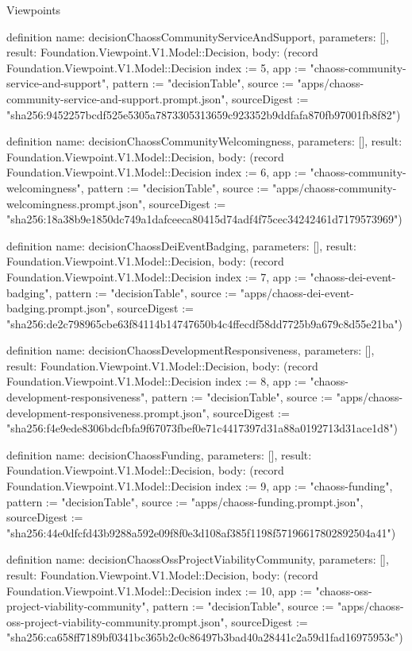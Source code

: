 \begin{lexlean}{Viewpoints}
\begin{semanticmodule}
definition{
  name: decisionChaossCommunityServiceAndSupport,
  parameters: [],
  result: Foundation.Viewpoint.V1.Model::Decision,
  body: (record Foundation.Viewpoint.V1.Model::Decision {index := 5, app := "chaoss-community-service-and-support", pattern := "decisionTable", source := "apps/chaoss-community-service-and-support.prompt.json", sourceDigest := "sha256:9452257bcdf525e5305a7873305313659c923352b9ddfafa870fb97001fb8f82"})
}

definition{
  name: decisionChaossCommunityWelcomingness,
  parameters: [],
  result: Foundation.Viewpoint.V1.Model::Decision,
  body: (record Foundation.Viewpoint.V1.Model::Decision {index := 6, app := "chaoss-community-welcomingness", pattern := "decisionTable", source := "apps/chaoss-community-welcomingness.prompt.json", sourceDigest := "sha256:18a38b9e1850dc749a1dafceeca80415d74adf4f75cec34242461d7179573969"})
}

definition{
  name: decisionChaossDeiEventBadging,
  parameters: [],
  result: Foundation.Viewpoint.V1.Model::Decision,
  body: (record Foundation.Viewpoint.V1.Model::Decision {index := 7, app := "chaoss-dei-event-badging", pattern := "decisionTable", source := "apps/chaoss-dei-event-badging.prompt.json", sourceDigest := "sha256:de2c798965cbe63f84114b14747650b4c4ffecdf58dd7725b9a679c8d55e21ba"})
}

definition{
  name: decisionChaossDevelopmentResponsiveness,
  parameters: [],
  result: Foundation.Viewpoint.V1.Model::Decision,
  body: (record Foundation.Viewpoint.V1.Model::Decision {index := 8, app := "chaoss-development-responsiveness", pattern := "decisionTable", source := "apps/chaoss-development-responsiveness.prompt.json", sourceDigest := "sha256:f4e9ede8306bdcfbfa9f67073fbef0e71c4417397d31a88a0192713d31ace1d8"})
}

definition{
  name: decisionChaossFunding,
  parameters: [],
  result: Foundation.Viewpoint.V1.Model::Decision,
  body: (record Foundation.Viewpoint.V1.Model::Decision {index := 9, app := "chaoss-funding", pattern := "decisionTable", source := "apps/chaoss-funding.prompt.json", sourceDigest := "sha256:44e0dfcfd43b9288a592e09f8f0e3d108af385f1198f57196617802892504a41"})
}

definition{
  name: decisionChaossOssProjectViabilityCommunity,
  parameters: [],
  result: Foundation.Viewpoint.V1.Model::Decision,
  body: (record Foundation.Viewpoint.V1.Model::Decision {index := 10, app := "chaoss-oss-project-viability-community", pattern := "decisionTable", source := "apps/chaoss-oss-project-viability-community.prompt.json", sourceDigest := "sha256:ca658ff7189bf0341bc365b2c0c86497b3bad40a28441c2a59d1fad16975953c"})
}


\end{semanticmodule}
\end{lexlean}
